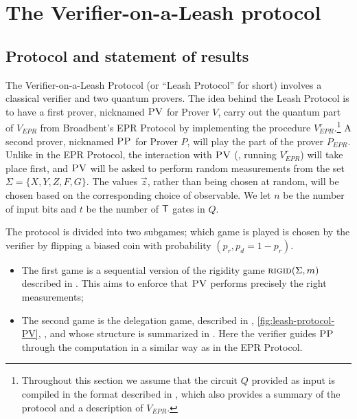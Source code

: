 \documentclass{toc}
\newcommand{\rigid}{\textsc{rigid}}
\newcommand{\pv}{\textsc{PV}}
\newcommand{\pp}{\textsc{PP}}
\begin{document}
 

\section{The Verifier-on-a-Leash protocol}   %
\label{sec:leash}





\subsection{Protocol and statement of results}
\label{sec:leash subsec}

The Verifier-on-a-Leash Protocol (or ``Leash Protocol'' for short) involves a classical verifier and two quantum provers.
The idea behind the Leash Protocol is to have a first prover, nicknamed $\pv$ for Prover $V$, carry out the quantum part of $V_{EPR}$ from Broadbent's EPR Protocol by implementing the procedure $V_{EPR}^r$.\footnote{Throughout this section we assume that the circuit $Q$ provided as input is compiled in the format described in , which also provides a summary of the protocol and a description of $V_{EPR}$.} A second prover, nicknamed $\pp$ for Prover $P$, will play the part of the prover $P_{EPR}$. Unlike in the EPR Protocol, the interaction with $\pv$ (\ie, running $V_{EPR}^r$) will take place {first}, and $\pv$ will be asked to perform {random} measurements from the set $\Sigma = \{X,Y,Z,F,G\}$. The values $\vec{z}$, rather than being chosen at random, will be chosen based on the corresponding choice of observable. We let $n$ be the number of input bits and $t$ be the number of $\sf T$ gates in $Q$. 

The protocol is divided into two subgames; which game is played is chosen by the verifier by flipping a biased coin with probability $(p_r,p_d=1-p_r)$.
\begin{itemize}[nolistsep]
\item The first game is a sequential version of the rigidity game $\rigid(\Sigma,m)$ described in . This aims to enforce that $\pv$ performs precisely the right measurements;

\item The second game is the delegation game, described in , \ref{fig:leash-protocol-PV}, , and whose structure is summarized in . Here the verifier guides $\pp$ through the computation in a similar way as in the EPR Protocol.
\end{itemize}
\end{document}
